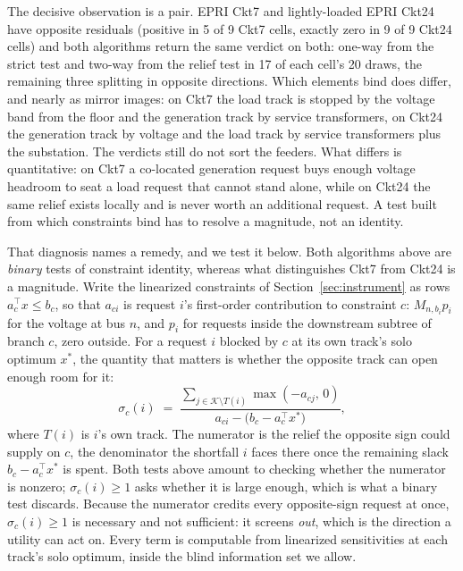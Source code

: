 \documentclass[review,authoryear,12pt]{elsarticle}
\begin{document}
The decisive observation is a pair. EPRI Ckt7 and lightly-loaded EPRI Ckt24
have opposite residuals (positive in 5 of 9 Ckt7 cells, exactly zero in 9 of
9 Ckt24 cells) and both algorithms return the same verdict on both: one-way
from the strict test and two-way from the relief test in 17 of each cell's 20
draws, the remaining three splitting in opposite directions. Which elements
bind does differ, and nearly as mirror images: on Ckt7 the load track is
stopped by the voltage band from the floor and the generation track by service
transformers, on Ckt24 the generation track by voltage and the load track by
service transformers plus the substation. The verdicts still do not sort the
feeders. What differs is quantitative: on Ckt7 a co-located generation request
buys enough voltage headroom to seat a load request that cannot stand alone,
while on Ckt24 the same relief exists locally and is never worth an additional
request. A test built from which constraints bind has to resolve a magnitude,
not an identity.

That diagnosis names a remedy, and we test it below. Both algorithms above are
\emph{binary} tests of constraint identity, whereas what distinguishes Ckt7
from Ckt24 is a magnitude. Write the linearized constraints of
Section~\ref{sec:instrument} as rows $a_c^{\top} x \le b_c$, so that $a_{ci}$
is request $i$'s first-order contribution to constraint $c$: $M_{n,b_i}
p_i$ for the voltage at bus $n$, and $p_i$ for requests inside the downstream
subtree of branch $c$, zero outside. For a request $i$ blocked by $c$ at
its own track's solo optimum $x^{\ast}$, the quantity that matters is whether
the opposite track can open enough room for it:
\begin{equation}
\sigma_c(i) \;=\;
\frac{\textstyle\sum_{j \in \mathcal{K} \setminus T(i)} \max(-a_{cj},\, 0)}
     {a_{ci} - \bigl(b_c - a_c^{\top} x^{\ast}\bigr)},
\label{eq:relief}
\end{equation}
where $T(i)$ is $i$'s own track. The numerator is the relief the opposite sign
could supply on $c$, the denominator the shortfall $i$ faces there once the
remaining slack $b_c - a_c^{\top}x^{\ast}$ is spent. Both tests above amount
to checking whether the numerator is nonzero; $\sigma_c(i) \ge 1$ asks whether
it is large enough, which is what a binary test discards. Because the
numerator credits every opposite-sign request at once, $\sigma_c(i) \ge 1$ is
necessary and not sufficient: it screens \emph{out}, which is the direction a
utility can act on. Every term is computable from
linearized sensitivities at each track's solo optimum, inside the blind
information set we allow.
\end{document}
